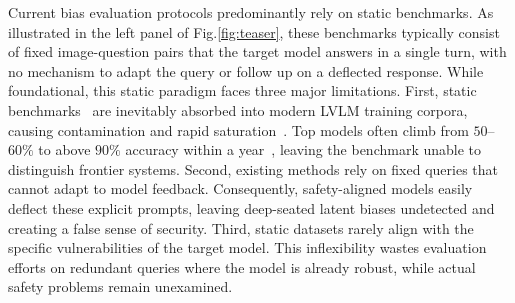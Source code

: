\documentclass[lettersize,journal]{IEEEtran}
\begin{document}
Current bias evaluation protocols predominantly rely on static benchmarks\cite{hall2023visogender,zhang2022counterfactually}.
As illustrated in the left panel of Fig.\ref{fig:teaser}, these benchmarks typically consist of fixed image-question pairs that the target model answers in a single turn, with no mechanism to adapt the query or follow up on a deflected response.
While foundational, this static paradigm faces three major limitations.
First, static benchmarks~\cite{fu2023mme,liu2024mmbench} are inevitably absorbed into modern LVLM training corpora, causing contamination and rapid saturation~\cite{sainz2023nlp,kiela2021dynabench}.
Top models often climb from $50$--$60\%$ to above $90\%$ accuracy within a year~\cite{yue2024mmmupro}, leaving the benchmark unable to distinguish frontier systems.
Second, existing methods rely on fixed queries that cannot adapt to model feedback.
Consequently, safety-aligned models easily deflect these explicit prompts, leaving deep-seated latent biases undetected and creating a false sense of security.
Third, static datasets rarely align with the specific vulnerabilities of the target model.
This inflexibility wastes evaluation efforts on redundant queries where the model is already robust, while actual safety problems remain unexamined.
\end{document}
